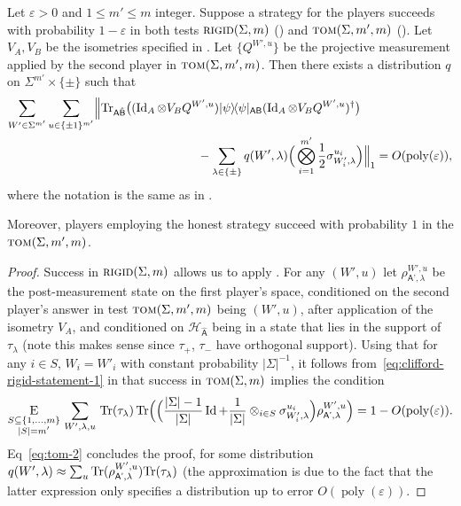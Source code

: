 \documentclass{toc}
\newcommand{\ket}[1]{|#1\rangle}
\newcommand{\bra}[1]{\langle#1|}
\newcommand{\proj}[1]{\ket{#1}\!\bra{#1}}
\newcommand{\Tr}{\mbox{\rm Tr}}
\newcommand{\Id}{\ensuremath{\mathop{\rm Id}\nolimits}}
\newcommand{\Es}[1]{\ensuremath{\mathop{\textsc{E}}}_{#1}} %
\DeclareMathOperator{\poly}{poly}
\newcommand{\reg}[1]{{\textsf{#1}}}
\newcommand{\mH}{\mathcal{H}}
\newcommand{\eps}{\varepsilon}
\newcommand{\rigid}{\textsc{rigid}}
\newcommand{\tom}{\textsc{tom}}
\begin{document}
\begin{corollary}\label{cor:clifford-rigid-adaptive}
Let $\eps>0$ and $1\leq m'\leq m$ integer. Suppose a strategy for the players
  succeeds with probability $1-\eps$ in both tests $\rigid(\Sigma,m)$
  () and $\tom(\Sigma,m',m)$
  (). Let $V_A,V_B$ be the isometries specified
  in . Let $\{Q^{W',u}\}$ be the projective
  measurement applied by the second player in $\tom(\Sigma,m',m)$. Then there exists a distribution $q$ on $\Sigma^{m'} \times \{\pm \}$ such that 
\begin{align*}
 \sum_{W'\in\Sigma^{m'}} \sum_{u\in\{\pm1\}^{m'}} &\Big\| \Tr_{\reg{A}\hat{\reg{B}}} \big((\Id_A \otimes V_B Q^{W',u} )\proj{\psi}_{\reg{AB}} (\Id_A \otimes V_B Q^{W',u})^\dagger\big)\\
&\hskip3cm - \sum_{\lambda\in\{\pm\}}  q(W',\lambda)  \Big( \bigotimes_{i=1}^{m'} \frac{1}{2}\sigma_{W'_i,\lambda}^{u_i}\Big) \Big\|_1 = O(\poly(\eps)),
\end{align*}
where the notation is the same as in . 

Moreover, players employing the honest strategy succeed with probability $1$ in the
 $\tom(\Sigma,m',m)$.
\end{corollary}

\begin{proof}
Success in $\rigid(\Sigma,m)$ allows us to apply . For any $(W',u)$ let $\rho_{\reg{A'},\lambda}^{W',u}$ be the post-measurement state on the first player's space, conditioned on the second player's answer  in test $\tom(\Sigma,m',m)$ being $(W',u)$, after application of the isometry $V_A$, and conditioned on $\mH_{\hat{\reg{A}}}$ being in a state that lies in the support of $\tau_\lambda$ (note this makes sense since $\tau_+$, $\tau_-$ have orthogonal support). 
Using that for any $i\in S$, $W_i=W'_i$ with constant probability $|\Sigma|^{-1}$, 
it follows from~\eqref{eq:clifford-rigid-statement-1}  in  that success in $\tom(\Sigma,m)$ implies the condition
\begin{equation}\label{eq:tom-2}
\Es{\substack{S\subseteq \{1,\ldots,m\}\\|S|=m'}}\, \sum_{W',\lambda,u}\,\Tr(\tau_\lambda)  \,\Tr\Big(\Big( \frac{|\Sigma|-1}{|\Sigma|}\Id + \frac{1}{|\Sigma|}\otimes_{i\in S}\sigma_{W'_i,\lambda}^{u_i} \Big) \rho_{\reg{A'},\lambda}^{W',u}\Big)  = 1- O(\poly(\eps)). 
\end{equation}
Eq~\eqref{eq:tom-2} concludes the proof, for some distribution $q(W',\lambda) \approx \sum_u \Tr(\rho_{\reg{A'},\lambda}^{W',u})\Tr(\tau_\lambda)$ (the approximation is due to the fact that the latter expression only specifies a distribution up to error $O(\poly(\eps))$.
\end{proof}
\end{document}
